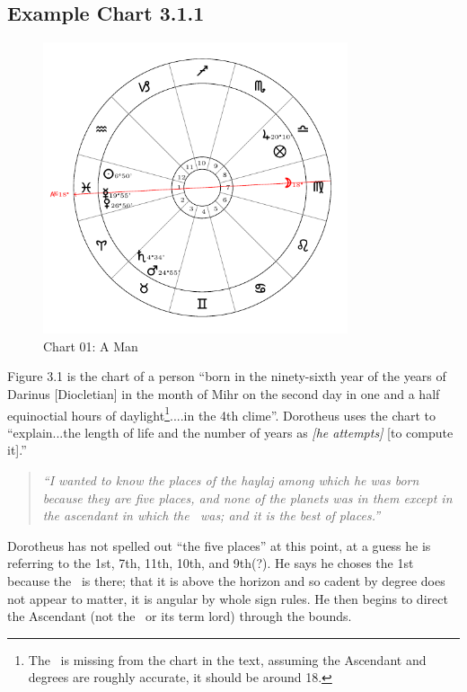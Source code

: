 \subsection{Example Chart 3.1.1}
\vspace{-1em}
\begin{figure}[H]
\centering
\includegraphics[width=0.8\textwidth]{charts/3_1_01}
\vspace{-1em}
\caption{Chart 01: A Man}
\end{figure}

Figure 3.1 is the chart of a person ``born in the ninety-sixth year of the years of Darinus [Diocletian] in the month of Mihr on the second day in one and a half equinoctial hours of daylight\footnote{The \Moon\, is missing from the chart in the text, assuming the Ascendant and \Sun\, degrees are roughly accurate, it should be around 18\Virgo.}....in the 4th clime''. Dorotheus uses the chart to ``explain...the length of life and the number of years as \textsl{[he attempts]} [to compute it].''

\begin{quote}
\textsl{``I  wanted to know the places of the haylaj among which he was born because they are five places, and none of the planets was in them except in the ascendant in which the \Sun\, was; and it is the best of places.''}
\end{quote}

Dorotheus has not spelled out ``the five places'' at this point, at a guess he is referring to the 1st, 7th, 11th, 10th, and 9th(?).  He says he choses the 1st because the \Sun\, is there; that it is above the horizon and so cadent by degree does not appear to matter, it is angular by whole sign rules. He then begins to direct the Ascendant (not the \Sun\, or its term lord) through the bounds.

